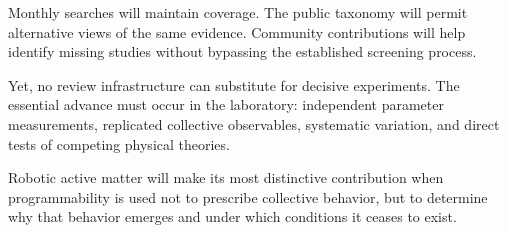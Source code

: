 Monthly searches
will maintain
coverage.
The public
taxonomy will
permit alternative
views of the
same evidence.
Community contributions
will help identify
missing studies
without bypassing
the established
screening process.

Yet, no review
infrastructure
can substitute
for decisive
experiments.
The essential
advance must
occur in the
laboratory:
independent
parameter measurements,
replicated collective
observables,
systematic variation,
and direct tests
of competing
physical theories.

Robotic active
matter will
make its
most distinctive
contribution
when programmability
is used not
to prescribe
collective behavior,
but to determine
why that behavior
emerges and
under which
conditions it
ceases to exist.